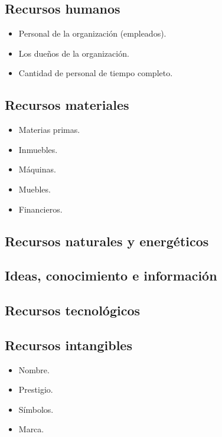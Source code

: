 \documentclass[10pt, spanish, a5paper]{article}
\begin{document}
\subsection{Recursos humanos}

\begin{itemize}
	\item Personal de la organización (empleados).
	\item Los dueños de la organización.
	\item Cantidad de personal de tiempo completo.
\end{itemize}

\subsection{Recursos materiales}

\begin{itemize}
	\item Materias primas.
	\item Inmuebles.
	\item Máquinas.
	\item Muebles.
	\item Financieros.
\end{itemize}

\subsection{Recursos naturales y energéticos}

\subsection{Ideas, conocimiento e información}

\subsection{Recursos tecnológicos}

\subsection{Recursos intangibles}

\begin{itemize}
	\item Nombre.
	\item Prestigio.
	\item Símbolos.
	\item Marca.
\end{itemize}
\end{document}
